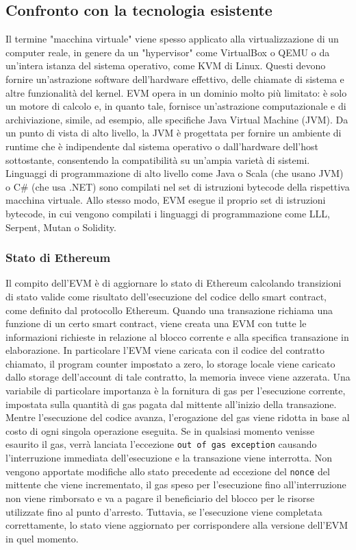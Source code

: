 \subsection*{Confronto con la tecnologia esistente}
Il termine "macchina virtuale" viene spesso applicato alla virtualizzazione di un computer reale, in genere da un "hypervisor" come VirtualBox o QEMU o da un'intera istanza del sistema operativo, come KVM di Linux. Questi devono fornire un'astrazione software dell'hardware effettivo, delle chiamate di sistema e altre funzionalità del kernel. EVM opera in un dominio molto più limitato: è solo un motore di calcolo e, in quanto tale, fornisce un'astrazione computazionale e di archiviazione, simile, ad esempio, alle specifiche Java Virtual Machine (JVM). Da un punto di vista di alto livello, la JVM è progettata per fornire un ambiente di runtime che è indipendente dal sistema operativo o dall'hardware dell'host sottostante, consentendo la compatibilità su un'ampia varietà di sistemi. Linguaggi di programmazione di alto livello come Java o Scala (che usano JVM) o C\# (che usa .NET) sono compilati nel set di istruzioni bytecode della rispettiva macchina virtuale. Allo stesso modo, EVM esegue il proprio set di istruzioni bytecode, in cui vengono compilati i linguaggi di programmazione come LLL, Serpent, Mutan o Solidity.

\subsubsection{Stato di Ethereum}
Il compito dell'EVM è di aggiornare lo stato di Ethereum calcolando transizioni di stato valide come risultato dell'esecuzione del codice dello smart contract, come definito dal protocollo Ethereum. Quando una transazione richiama una funzione di un certo smart contract, viene creata una EVM con tutte le informazioni richieste in relazione al blocco corrente e alla specifica transazione in elaborazione. In particolare l'EVM viene caricata con il codice del contratto chiamato, il program counter impostato a zero, lo storage locale viene caricato dallo storage dell'account di tale contratto, la memoria invece viene azzerata. Una variabile di particolare importanza è la fornitura di gas per l'esecuzione corrente, impostata sulla quantità di gas pagata dal mittente all'inizio della transazione. Mentre l'esecuzione del codice avanza, l'erogazione del gas viene ridotta in base al costo di ogni singola operazione eseguita. Se in qualsiasi momento venisse esaurito il gas, verrà lanciata l'eccezione \lstinline|out of gas exception| causando l'interruzione immediata dell'esecuzione e la transazione viene interrotta. Non vengono apportate modifiche allo stato precedente ad eccezione del \lstinline|nonce| del mittente che viene incrementato, il gas speso per l'esecuzione fino all'interruzione non viene rimborsato e va a pagare il beneficiario del blocco per le risorse utilizzate fino al punto d'arresto. Tuttavia, se l'esecuzione viene completata correttamente, lo stato viene aggiornato per corrispondere alla versione dell'EVM in quel momento. 

